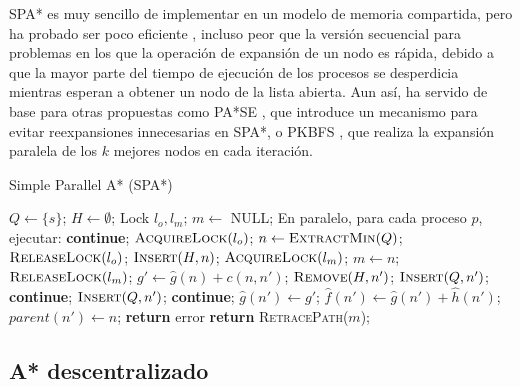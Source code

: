 \documentclass[a4paper,12pt]{article}
\begin{document}
SPA* es muy sencillo de implementar en un modelo de memoria compartida, pero ha probado ser poco eficiente \cite{lai1984anomalies}, incluso peor que la versión secuencial para problemas en los que la operación de expansión de un nodo es rápida, debido a que la mayor parte del tiempo de ejecución de los procesos se desperdicia mientras esperan a obtener un nodo de la lista abierta. Aun así, ha servido de base para otras propuestas como PA*SE \cite{phillips2014pa}, que introduce un mecanismo para evitar reexpansiones innecesarias en SPA*, o PKBFS \cite{vidal2010adaptive}, que realiza la expansión paralela de los $k$ mejores nodos en cada iteración.

\begin{algorithm}[H]
\begin{algorithmic}[1]
\caption{Simple Parallel A* (SPA*)}\label{spastar}
\State $Q \gets \{s\}$;
\State $H \gets \emptyset$;
\State Lock $l_o, l_m$;
\State $m \gets$ NULL;
\State En paralelo, para cada proceso $p$, ejecutar:
        \State \textbf{continue};
    \EndIf
    \State $\textsc{AcquireLock}(l_o)$;
    \State $n \gets \textsc{ExtractMin}(Q)$;
    \State $\textsc{ReleaseLock}(l_o)$;
    \State $\textsc{Insert}(H, n)$;
        \State $\textsc{AcquireLock}(l_m)$;
            \State $m \gets n$;
        \EndIf
        \State $\textsc{ReleaseLock}(l_m)$;
    \EndIf
        \State $g' \gets \hat{g}(n)+c(n, n')$;
                \State $\textsc{Remove}(H,n')$;
                \State $\textsc{Insert}(Q, n')$;
            \Else
                \State \textbf{continue};
            \EndIf
        \Else
                \State $\textsc{Insert}(Q,n')$;
                \State \textbf{continue};
            \EndIf
        \EndIf
        \State $\hat{g}(n') \gets g'$;
        \State $\hat{f}(n') \gets \hat{g}(n') + \hat{h}(n')$;
        \State $parent(n') \gets n$;
    \EndFor
\EndWhile
{}
    \State \textbf{return} error
\Else
    \State \textbf{return} \textsc{RetracePath}($m$);
\EndIf
\end{algorithmic}
\end{algorithm}

\subsection{A* descentralizado} \label{sec:descentralizado}
\end{document}
